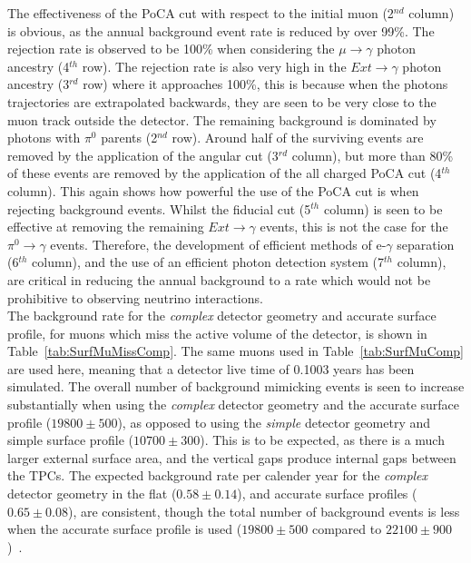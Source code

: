 The effectiveness of the PoCA cut with respect to the initial muon (2$^{nd}$ column) is obvious, as the annual background event rate is reduced by over 99\%. The rejection rate is observed to be 100\% when considering the $\mu\to\gamma$ photon ancestry (4$^{th}$ row). The rejection rate is also very high in the $Ext\to\gamma$ photon ancestry (3$^{rd}$ row) where it approaches 100\%, this is because when the photons trajectories are extrapolated backwards, they are seen to be very close to the muon track outside the detector. The remaining background is dominated by photons with $\pi^{0}$ parents (2$^{nd}$ row). Around half of the surviving events are removed by the application of the angular cut (3$^{rd}$ column), but more than 80\% of these events are removed by the application of the all charged PoCA cut (4$^{th}$ column). This again shows how powerful the use of the PoCA cut is when rejecting background events. Whilst the fiducial cut (5$^{th}$ column) is seen to be effective at removing the remaining $Ext\to\gamma$ events, this is not the case for the $\pi^0\to\gamma$ events. Therefore, the development of efficient methods of e-$\gamma$ separation (6$^{th}$ column), and the use of an efficient photon detection system (7$^{th}$ column), are critical in reducing the annual background to a rate which would not be prohibitive to observing neutrino interactions. \\

The background rate for the \emph{complex} detector geometry and accurate surface profile, for muons which miss the active volume of the detector, is shown in Table~\ref{tab:SurfMuMissComp}. The same muons used in Table~\ref{tab:SurfMuComp} are used here, meaning that a detector live time of 0.1003 years has been simulated. The overall number of background mimicking events is seen to increase substantially  when using the \emph{complex} detector geometry and the accurate surface profile ($19800\pm500$), as opposed to using the \emph{simple} detector geometry and simple surface profile ($10700\pm300$). This is to be expected, as there is a much larger external surface area, and the vertical gaps produce internal gaps between the TPCs. The expected background rate per calender year for the \emph{complex} detector geometry in the flat ($0.58\pm0.14$), and accurate surface profiles ($0.65\pm0.08$), are consistent, though the total number of background events is less when the accurate surface profile is used ($19800\pm500$ compared to $22100\pm900$)~\citep{MartinsThesis}. \\

